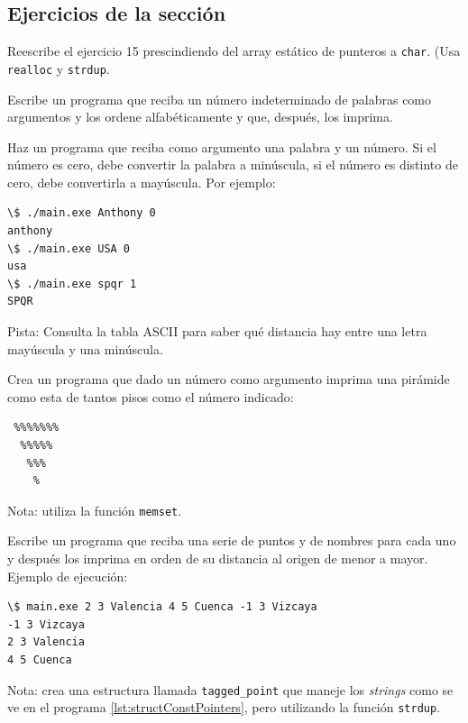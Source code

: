 \documentclass[a4paper]{article}
\begin{document}
\subsection{Ejercicios de la sección}
\begin{exercises}[resume*]
\item Reescribe el ejercicio 15 prescindiendo del array estático de punteros
a \verb!char!. (Usa \verb!realloc! y \verb!strdup!.

\item Escribe un programa que reciba un número indeterminado de palabras como
argumentos y los ordene alfabéticamente y que, después, los imprima.
\item Haz un programa que reciba como argumento una palabra y un número. Si el
número es cero, debe convertir la palabra a minúscula, si el número es distinto
de cero, debe convertirla a mayúscula. Por ejemplo:

\noindent
\begin{minipage}[H]{\linewidth}
\begin{lstlisting}[style=terminalStyle]
\$ ./main.exe Anthony 0
anthony
\$ ./main.exe USA 0
usa
\$ ./main.exe spqr 1
SPQR
\end{lstlisting}
\end{minipage}
Pista: Consulta la tabla ASCII para saber qué distancia hay entre una letra
mayúscula y una minúscula.
\item Crea un programa que dado un número como argumento imprima una pirámide
como esta de tantos pisos como el número indicado:

\noindent
\begin{minipage}[H]{\linewidth}
\begin{lstlisting}[style=terminalStyle]
%%%%%%%%%
 %%%%%%%
  %%%%%
   %%%
    %
\end{lstlisting}
\end{minipage}
Nota: utiliza la función \verb+memset+.
\item Escribe un programa que reciba una serie de puntos y de nombres para
cada uno y después los imprima en orden de su distancia al origen de menor a
mayor. Ejemplo de ejecución:

\noindent
\begin{minipage}[H]{\linewidth}
\begin{lstlisting}[style=terminalStyle]
\$ main.exe 2 3 Valencia 4 5 Cuenca -1 3 Vizcaya
-1 3 Vizcaya
2 3 Valencia
4 5 Cuenca
\end{lstlisting}
Nota: crea una estructura llamada \verb!tagged_point! que maneje los
\textit{strings} como se ve en el programa
\ref{lst:structConstPointers}, pero utilizando la función \verb!strdup!.
\end{minipage}
\end{exercises}
\end{document}
